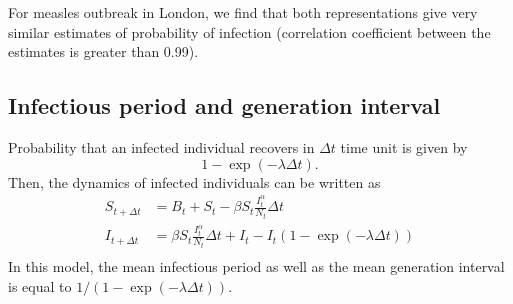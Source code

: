 \documentclass{article}
\begin{document}
For measles outbreak in London, we find that both representations give very similar estimates of probability of infection (correlation coefficient between the estimates is greater than 0.99).

\subsection{Infectious period and generation interval}

Probability that an infected individual recovers in $\Delta t$ time unit is given by
\begin{equation}
1 - \exp (- \lambda \Delta t).
\end{equation}
Then, the dynamics of infected individuals can be written as
\begin{equation}
\begin{aligned}
S_{t+\Delta t} &= B_t + S_t - \beta S_t \frac{I_t^\alpha}{N_t} \Delta t\\
I_{t+\Delta t} &= \beta S_t \frac{I_t^\alpha}{N_t} \Delta t + I_t - I_t \left(1 - \exp (- \lambda \Delta t) \right) \\
\end{aligned}
\end{equation}
In this model, the mean infectious period as well as the mean generation interval is equal to $1/(1 - \exp (- \lambda \Delta t))$.
\end{document}
